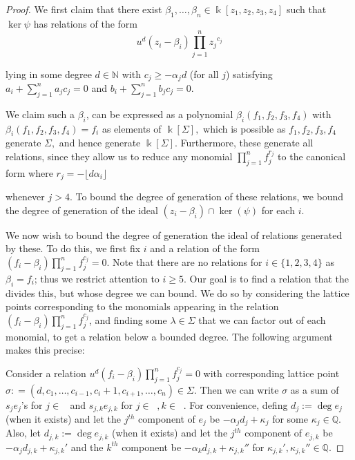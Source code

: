 \documentclass{amsart}
\theoremstyle{plain}
\theoremstyle{definition}
\theoremstyle{remark}
\numberwithin{equation}{section}
\newcommand\bq{{\mathbb Q}}
\newcommand\bz{{\mathbb Z}}
\newcommand\bk{{\Bbbk}}
\newcommand\bida{a}
\newcommand\bidb{b}
\DeclareMathOperator{\Te}{T_=}
\DeclareMathOperator{\Tp}{T_+}
\DeclareMathOperator{\Tm}{T_-}
\begin{document}
\begin{proof}
We first claim that there exist $\beta_1, \ldots, \beta_n\in \bk[z_1, z_2, z_3, z_4]$
 such that $\ker \psi$ has relations of the form
\begin{equation}
\label{eqn:hirz-relations-psi}
	u^d(z_i - \beta_i)\prod_{j=1}^n {z_j}^{c_{j}}
\end{equation}

\noindent
lying in some degree $d \in \mathbb{N}$
with $c_j \ge -\alpha_j d$ (for all $j$) satisfying $\bida_i + \sum_{j = 1}
^n \bida_j c_j = 0$ and $\bidb_i + \sum_{j=1}^n \bidb_j c_j = 0$.

We claim such a $\beta_i$,
can be expressed as a polynomial $\beta_i(f_1,f_2,f_3,f_4)$ with 
$\beta_i(f_1,f_2,f_3,f_4) = f_i$
as elements of $\bk[\Sigma],$ which is possible as $f_1,f_2,f_3,f_4$ generate $\Sigma,$ and hence generate $\bk[\Sigma]$. Furthermore, these
generate all relations, since they allow us to reduce any monomial $\prod_{j =
1}^n f_j^{r_j}$ to the canonical form where $r_j = - \lfloor d \alpha_i
\rfloor$

 whenever $j > 4$.  To bound the degree of generation of these relations, we bound the degree of generation of the ideal $(z_i - \beta_i) \cap \ker(\psi)$ for each $i$.

We now wish to bound the degree of generation the ideal of relations generated by these.  To do this, we first fix $i$ and a relation of the form $(f_i - \beta_i)\prod_{j=1}^n f_j^{c_j}=0.$ Note that there are no relations for $i\in \{1, 2, 3, 4\}$ as $\beta_i = f_i$; thus we restrict attention to $i \ge 5$. Our goal is to find a relation that the divides this, but whose degree we can bound. We do so by considering the lattice points corresponding to the monomials appearing in the relation $(f_i - \beta_i)\prod_{j=1}^n f_j^{c_j}$, and finding some $\lambda\in \Sigma$
that we can factor out of each monomial, to get a relation below a bounded degree.  The following argument makes this precise:


Consider a relation $u^d(f_i - \beta_i)\prod_{j=1}^n f_j^{c_j}=0$ with corresponding lattice point $\sigma: = (d, c_1, \ldots, c_{i-1}, c_{i}+1, c_{i+1}, \ldots, c_n) \in \Sigma$.
Then we can write $\sigma$ as a sum of $s_j e_j$'s for $j\in
\Te$ and $s_{j,k}e_{j,k}$ for $j\in \Tp, k\in \Tm$.  
For convenience, defing $d_j := \deg e_j$ (when it exists) and let the $j^{th}$
component of $e_j$ be $-\alpha_j d_j + \kappa_j$ for some $\kappa_j \in \bq$. Also, let $d_{j,k} := \deg e_{j,k}$ (when it exists) and let the $j^{th}$ component of $e_{j,k}$ be $-\alpha_j d_{j,k} + \kappa_{j,k}'$ and the $k^{th}$
component be $-\alpha_k d_{j,k} + \kappa_{j,k}''$ for $\kappa_{j,k}', \kappa_{j,k}'' \in \bq$.


\end{proof}
\end{document}
